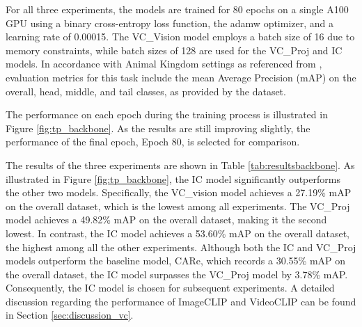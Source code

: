 For all three experiments, the models are trained for 80 epochs on a single A100 GPU using a binary cross-entropy loss function, the adamw optimizer, and a learning rate of 0.00015. The VC\_Vision model employs a batch size of 16 due to memory constraints, while batch sizes of 128 are used for the VC\_Proj and IC models. In accordance with Animal Kingdom settings as referenced from \parencite{ng2022animal}, evaluation metrics for this task include the mean Average Precision (mAP) on the overall, head, middle, and tail classes, as provided by the dataset. 


The performance on each epoch during the training process is illustrated in Figure \ref{fig:tp_backbone}. As the results are still improving slightly, the performance of the final epoch, Epoch 80, is selected for comparison. 

The results of the three experiments are shown in Table \ref{tab:resultsbackbone}. As illustrated in Figure \ref{fig:tp_backbone}, the IC model significantly outperforms the other two models. Specifically, the VC\_vision model achieves a 27.19\% mAP on the overall dataset, which is the lowest among all experiments. The VC\_Proj model achieves a 49.82\% mAP on the overall dataset, making it the second lowest. In contrast, the IC model achieves a 53.60\% mAP on the overall dataset, the highest among all the other experiments. Although both the IC and VC\_Proj models outperform the baseline model, CARe, which records a 30.55\% mAP on the overall dataset, the IC model surpasses the VC\_Proj model by 3.78\% mAP. Consequently, the IC model is chosen for subsequent experiments. A detailed discussion regarding the performance of ImageCLIP and VideoCLIP can be found in Section \ref{sec:discussion_vc}.

